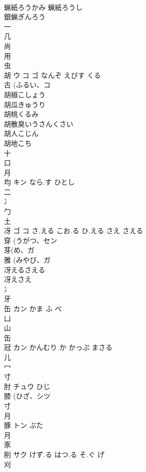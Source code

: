 \documentclass[8pt]{extreport}
\begin{document}
\begin{CJK}{UTF8}{min}
\\	蝋紙ろうかみ 蝋紙ろうし 
\\	銀蝋ぎんろう 
\\	一 
\\	几 
\\	尚 
\\	用 
\\	虫 
\\	胡	ウ コ ゴ	なんぞ えびす くる	
\\	古 (ふるい、コ 
\\	胡椒こしょう 
\\	胡瓜きゅうり 
\\	胡桃くるみ 
\\	胡散臭いうさんくさい 
\\	胡人こじん 
\\	胡地こち 
\\	十 
\\	口 
\\	月 
\\	均	キン	なら.す ひとし	
\\	二 
\\	冫 
\\	勹 
\\	土 
\\	冴	ゴ コ	さ.える こお.る ひ.える さえ さえる	
\\	穿 (うがつ、セン 
\\	芽(め、ガ 
\\	雅 (みやび、ガ 
\\	冴えるさえる
\\	冴えさえ
\\	冫 
\\	牙 
\\	缶	カン	かま ふ べ	
\\	凵 
\\	山 
\\	缶 
\\	冠	カン	かんむり か かっぷ まさる	
\\	儿 
\\	冖 
\\	寸 
\\	肘	チュウ	ひじ	
\\	膝 (ひざ、シツ 
\\	寸 
\\	月 
\\	豚	トン	ぶた	
\\	月 
\\	豕 
\\	削	サク	けず.る はつ.る そ.ぐ げ	
\\	刈 

\end{CJK}
\end{document}

